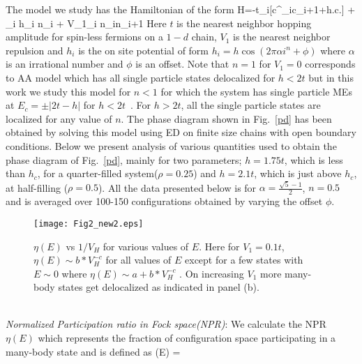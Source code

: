 \documentclass[prl,aps,twocolumn,floats,nofootinbib,showpacs]{revtex4}
\begin{document}
The model we study has the Hamiltonian of the form 
\bea
H=-t\sum_{i}[c^\dagger_ic_{i+1}+h.c.] + \sum_i h_i n_i + V_1\sum_i n_in_{i+1}
\label{model}
\eea
Here $t$ is the nearest neighbor hopping amplitude for spin-less fermions on a $1-d$ chain, $V_1$ is the nearest neighbor repulsion and $h_i$ is the on site potential of form $h_i=h \cos(2\pi\alpha i^n+\phi)$ where $\alpha$ is an irrational number and $\phi$ is an offset. Note that $n=1$ for $V_1=0$ corresponds to AA model which has all single particle states delocalized for $h < 2t$ but in this work we study this model for $n < 1$ for which the system has single particle MEs at $E_c=\pm|2t-h|$ for $h < 2t$~\cite{Sarma1990}. For $h>2t$, all the single particle states are localized for any value of $n$. The phase diagram shown in Fig.~\ref{pd} has been obtained by solving this model using ED on finite size chains with open boundary conditions.
Below we present analysis of various quantities used to obtain the phase diagram of Fig.~\ref{pd}, mainly for two parameters; $h=1.75t$, which is less than $h_c$, for a quarter-filled system($\rho=0.25$) and $h=2.1t$, which is just above $h_c$, at half-filling ($\rho=0.5$). All the data presented below is for $\alpha=\frac{\sqrt{5}-1}{2}$, $n=0.5$ and is averaged over 100-150 configurations obtained by varying the offset $\phi$. 
\begin{figure}[h!]
\begin{center}
\hskip-0.35cm
\texttt{[image: Fig2\_new2.eps]}
\vskip-0.3cm
\caption{$\eta(E)$ vs $1/V_H$ for various values of $E$. Here for $V_1=0.1t$, $\eta(E) \sim b*V_H^{-c}$ for all values of $E$ except for a few states with $E \sim 0$ where  $\eta(E)\sim a+b*V_H^{-c}$ .
On increasing $V_1$ more many-body states get delocalized as indicated in panel (b).}
\label{NPR1}
\end{center}
\end{figure}
\\
{\it{Normalized Participation ratio in Fock space(NPR)}}:
We calculate the NPR $\eta(E)$ which represents the fraction of configuration space participating in a many-body state and is defined as
\be
\eta(E) = 
\ee
\end{document}
